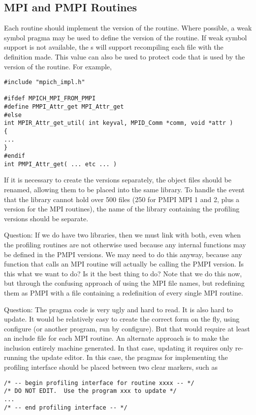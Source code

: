 \documentclass{article}
\begin{document}
\subsection{MPI and PMPI Routines}
\label{sec:pmpi-routines}
Each routine should implement the  version of the routine.
Where possible, a weak symbol pragma may be used to define the
 version of the routine.  If weak symbol support is not
available, the s will support recompiling each file
with the definition  made.  This value
can also be used to protect code that is used by the 
version of the routine.  For example, 
\begin{verbatim}
#include "mpich_impl.h"

#ifdef MPICH_MPI_FROM_PMPI
#define PMPI_Attr_get MPI_Attr_get
#else
int MPIR_Attr_get_util( int keyval, MPID_Comm *comm, void *attr )
{
...
}
#endif
int PMPI_Attr_get( ... etc ... )
\end{verbatim}

If it is necessary to create the  versions separately, the
object files should be renamed, allowing them to be placed into the
same library.  To handle the event that the library cannot hold over
500 files (250 for PMPI MPI 1 and 2, plus a version for the MPI
routines), the name of the library containing the profiling versions
should be separate.

Question: If we do have two libraries, then we must link with both,
even when the profiling routines are not otherwise used because any
internal functions may be defined in the PMPI versions.  We may need
to do this anyway, because any function that calls an MPI routine will
actually be calling the PMPI version.  Is this what we want to do?  Is
it the best thing to do?  Note that we do this now, but through the
confusing approach of using the MPI file names, but redefining them as PMPI
with a file containing a redefinition of every single MPI routine.

Question: The pragma code is very ugly and hard to read.  It is also hard to
update.
It would be relatively
easy to create the correct form on the fly, using configure (or
another program, run by configure).  But that
would require at least an include file for each MPI routine.
An alternate approach is to make the inclusion entirely machine
generated.  In that case, updating it requires only re-running the
update editor.  In this case, the pragmas for implementing the
profiling interface should be placed between two clear markers, such
as 
\begin{verbatim}
/* -- begin profiling interface for routine xxxx -- */
/* DO NOT EDIT.  Use the program xxx to update */
...
/* -- end profiling interface -- */
\end{verbatim}
\end{document}
